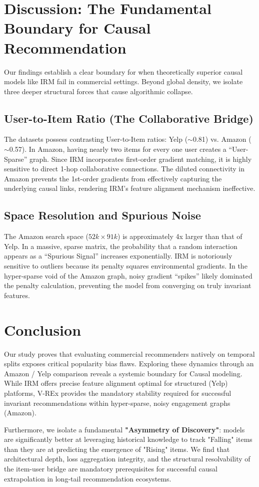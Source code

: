 \documentclass{article}
\begin{document}
\section{Discussion: The Fundamental Boundary for Causal Recommendation}
Our findings establish a clear boundary for when theoretically superior causal models like IRM fail in commercial settings. Beyond global density, we isolate three deeper structural forces that cause algorithmic collapse.

\subsection{User-to-Item Ratio (The Collaborative Bridge)}
The datasets possess contrasting User-to-Item ratios: Yelp ($\sim$0.81) vs. Amazon ($\sim$0.57). In Amazon, having nearly two items for every one user creates a ``User-Sparse'' graph. Since IRM incorporates first-order gradient matching, it is highly sensitive to direct 1-hop collaborative connections. The diluted connectivity in Amazon prevents the 1st-order gradients from effectively capturing the underlying causal links, rendering IRM's feature alignment mechanism ineffective.

\subsection{Space Resolution and Spurious Noise}
The Amazon search space ($52k \times 91k$) is approximately 4x larger than that of Yelp. In a massive, sparse matrix, the probability that a random interaction appears as a ``Spurious Signal'' increases exponentially. IRM is notoriously sensitive to outliers because its penalty squares environmental gradients. In the hyper-sparse void of the Amazon graph, noisy gradient ``spikes'' likely dominated the penalty calculation, preventing the model from converging on truly invariant features.

\section{Conclusion}
Our study proves that evaluating commercial recommenders natively on temporal splits exposes critical popularity bias flaws. Exploring these dynamics through an Amazon / Yelp comparison reveals a systemic boundary for Causal modeling. While IRM offers precise feature alignment optimal for structured (Yelp) platforms, V-REx provides the mandatory stability required for successful invariant recommendations within hyper-sparse, noisy engagement graphs (Amazon). 

Furthermore, we isolate a fundamental \textbf{"Asymmetry of Discovery"}: models are significantly better at leveraging historical knowledge to track "Falling" items than they are at predicting the emergence of "Rising" items. We find that architectural depth, loss aggregation integrity, and the structural resolvability of the item-user bridge are mandatory prerequisites for successful causal extrapolation in long-tail recommendation ecosystems. 
\end{document}
